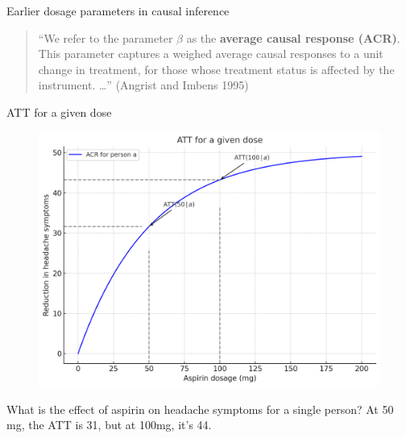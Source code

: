 \documentclass{beamer}
\begin{document}
\begin{frame}{Earlier dosage parameters in causal inference}

\begin{quote}
``We refer to the parameter $\beta$ as the \textbf{average causal response (ACR)}. This parameter captures a weighed average causal responses to a unit change in treatment, for those whose treatment status is affected by the instrument. \dots '' (Angrist and Imbens 1995)
\end{quote}

\end{frame}


\begin{frame}{ATT for a given dose}

\begin{figure}
\begin{center}
             \includegraphics[scale=0.3]{./lecture_includes/acrt_fig1.png}
\end{center}
\end{figure}

What is the effect of aspirin on headache symptoms for a single person?  At 50 mg, the ATT is 31, but at 100mg, it's 44.   


\end{frame}
\end{document}
